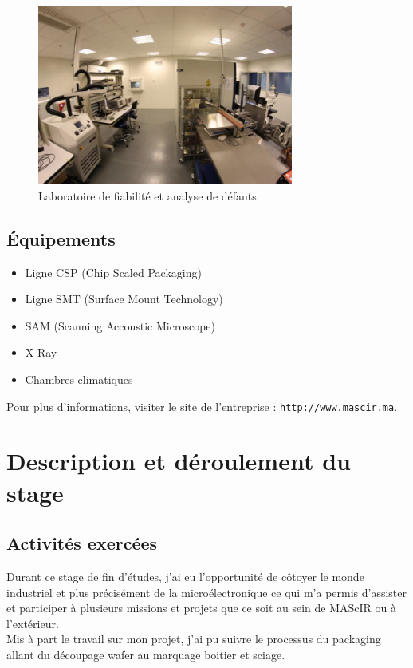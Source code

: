\documentclass[11pt, a4paper, twoside]{book}
\begin{document}
\begin{figure}[H]
\centering
\includegraphics[width=0.75\textwidth]{labo}
\caption{Laboratoire de fiabilité et analyse de défauts}
\end{figure}

\subsection{Équipements}
\begin{itemize}
\item Ligne CSP (Chip Scaled Packaging)
\item Ligne SMT (Surface Mount Technology)
\item SAM (Scanning Accoustic Microscope)
\item X-Ray
\item Chambres climatiques
\end{itemize}

Pour plus d'informations, visiter le site de l'entreprise : \texttt{http://www.mascir.ma}.

\section{Description et déroulement du stage}
\subsection{Activités exercées}
Durant ce stage de fin d’études, j’ai eu l’opportunité de côtoyer le monde industriel et plus précisément de la microélectronique ce qui m’a permis d’assister et participer à plusieurs missions et projets que ce soit au sein de MAScIR ou à l’extérieur.\\

Mis à part le travail sur mon projet, j’ai pu suivre le processus du packaging allant du découpage wafer au marquage boitier et sciage.\\
\end{document}
